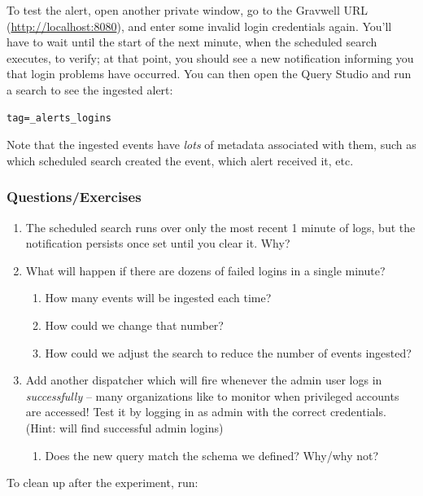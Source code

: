 To test the alert, open another private window, go to the Gravwell URL (\href{http://localhost:8080}{http://localhost:8080}), and enter some invalid login credentials again. You'll have to wait until the start of the next minute, when the scheduled search executes, to verify; at that point, you should see a new notification informing you that login problems have occurred. You can then open the Query Studio and run a search to see the ingested alert:

\begin{Verbatim}[breaklines=true]
tag=_alerts_logins
\end{Verbatim}

Note that the ingested events have \emph{lots} of metadata associated with them, such as which scheduled search created the event, which alert received it, etc.

\subsubsection{Questions/Exercises}

\begin{enumerate}
\item The scheduled search runs over only the most recent 1 minute of logs, but the notification persists once set until you clear it. Why?
\item What will happen if there are dozens of failed logins in a single minute?
  \begin{enumerate}
  \item How many events will be ingested each time?
  \item How could we change that number?
  \item How could we adjust the search to reduce the number of events ingested?
  \end{enumerate}
\item Add another dispatcher which will fire whenever the admin user logs in \emph{successfully} -- many organizations like to monitor when privileged accounts are accessed! Test it by logging in as admin with the correct credentials. (Hint:  will find successful admin logins)
  \begin{enumerate}
  \item Does the new query match the schema we defined? Why/why not?
  \end{enumerate}
\end{enumerate}

To clean up after the experiment, run:

